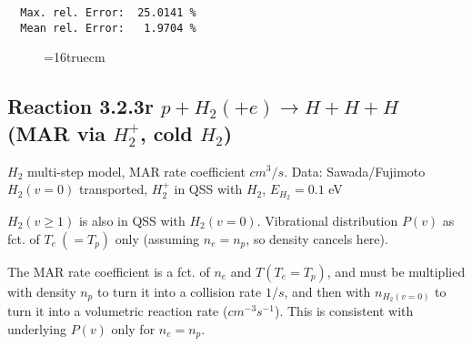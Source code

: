 \documentclass[12pt,dvipdfmx]{article}
\begin{document}
\begin{small}
\begin{verbatim}
  Max. rel. Error:  25.0141 %
  Mean rel. Error:   1.9704 %

\end{verbatim}\end{small}
\begin{figure} \label{2.3.18B1}
\epsfxsize=16truecm
\end{figure}
\newpage

\subsection{
Reaction 3.2.3r   $p + H_2 (+e)   \rightarrow H + H + H  $ (MAR via $H_2^+$, cold $H_2$)
}

$H_2$ multi-step model, MAR rate coefficient $cm^3/s$.
Data: Sawada/Fujimoto \cite{kn:Sawada}
$H_2(v=0)$ transported, $H_2^+$ in QSS with $H_2$, $E_{H_2}=0.1$ eV

$H_2(v\geq 1)$ is also in QSS with $H_2(v=0)$. Vibrational distribution $P(v)$ as fct. of $T_e~(=T_p)$ only (assuming $n_e=n_p$, so density cancels here).

The MAR rate coefficient is a fct. of $n_e$ and $T (T_e=T_p)$, and must be multiplied with density $n_p$ to turn it into a collision rate $1/s$,
and then with $n_{H_2(v=0)}$ to turn it into a volumetric reaction rate ($cm^{-3}s^{-1}$). This is consistent with underlying $P(v)$ only
for $n_e=n_p$.
\end{document}
